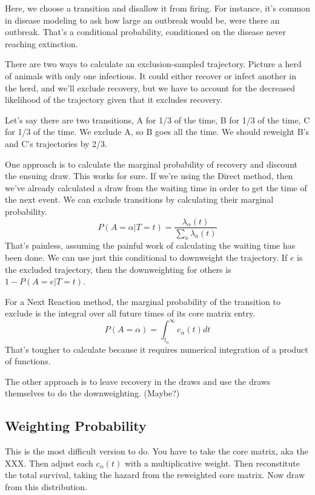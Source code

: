 \documentclass{article}
\begin{document}
Here, we choose a transition and disallow it from firing. For instance, it's common in disease modeling to ask how large an outbreak would be, were there an outbreak. That's a conditional probability, conditioned on the disease never reaching extinction. 

There are two ways to calculate an exclusion-sampled trajectory. Picture a herd of animals with only one infectious. It could either recover or infect another in the herd, and we'll exclude recovery, but we have to account for the decreased likelihood of the trajectory given that it excludes recovery.

Let's say there are two transitions, A for 1/3 of the time, B for 1/3 of the time, C for 1/3 of the time. We exclude A, so B goes all the time. We should reweight B's and C's trajectories by 2/3.

One approach is to calculate the marginal probability of recovery and discount the ensuing draw. This works for sure. If we're using the Direct method, then we've already calculated a draw from the waiting time in order to get the time of the next event. We can exclude transitions by calculating their marginal probability.
\begin{equation}
	P(A=\alpha|T=t) = \frac{\lambda_\alpha(t)}{\sum_a \lambda_a(t)}
\end{equation}
That's painless, assuming the painful work of calculating the waiting time has been done. We can use just this conditional to downweight the trajectory. If $e$ is the excluded trajectory, then the downweighting for others is $1-P(A=e|T=t)$.

For a Next Reaction method, the marginal probability of the transition to exclude is the integral over all future times of its core matrix entry.
\begin{equation}
	P(A=\alpha) = \int_{t_n}^\infty c_\alpha(t)dt
\end{equation}
That's tougher to calculate because it requires numerical integration of a product of functions.

The other approach is to leave recovery in the draws and use the draws themselves to do the downweighting. (Maybe?)


\subsection{Weighting Probability}

This is the most difficult version to do. You have to take the core matrix, aka the XXX. Then adjust each $c_\alpha(t)$ with a multiplicative weight. Then reconstitute the total survival, taking the hazard from the reweighted core matrix. Now draw from this distribution.
\end{document}

